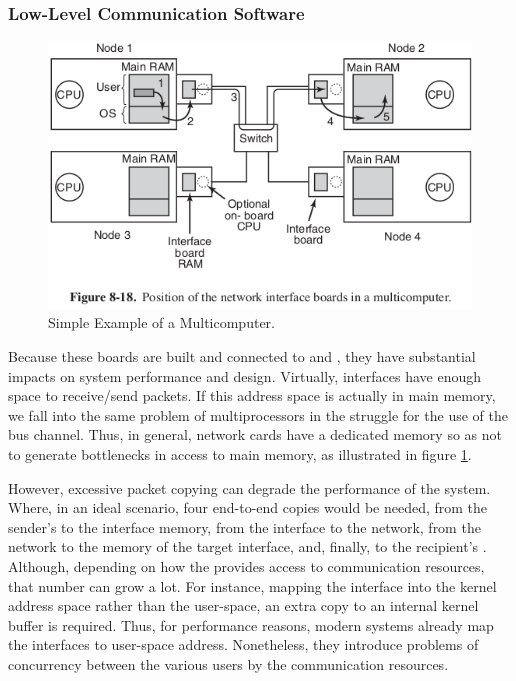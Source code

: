 			\subsubsection{Low-Level Communication Software}
			\label{sec.multicomputers-low-sw}

				\begin{figure}[h]
					\centering
					\includegraphics[width=.8\textwidth]{images/multicomputer.png}

					\caption{
						Simple Example of a Multicomputer.
					}\par
					\label{fig.multicomputer}
				\end{figure}

				Because these boards are built and connected to \cpus and \ram,
				they have substantial impacts on system performance and \os design.
				Virtually, interfaces have enough \ram space to receive/send packets.
				If this address space is actually in main memory, we fall into the same
				problem of multiprocessors in the struggle for the use of the bus channel.
				Thus, in general, network cards have a dedicated memory so as not to
				generate bottlenecks in access to main memory, as illustrated in figure \ref{fig.multicomputer}.

				However, excessive packet copying can degrade the performance of the system.
				Where, in an ideal scenario, four end-to-end copies would be needed,
				\ie from the sender's \ram to the interface memory, from the interface
				to the network, from the network to the memory of the target interface, and,
				finally, to the recipient's \ram.
				Although, depending on how the \os provides access to communication
				resources, that number can grow a lot.
				For instance, mapping the interface into the kernel address space
				rather than the user-space, an extra copy to an internal kernel
				buffer is required.
				Thus, for performance reasons, modern systems already map the interfaces
				to user-space address.
				Nonetheless, they introduce problems of concurrency between the various
				users by the communication resources.

